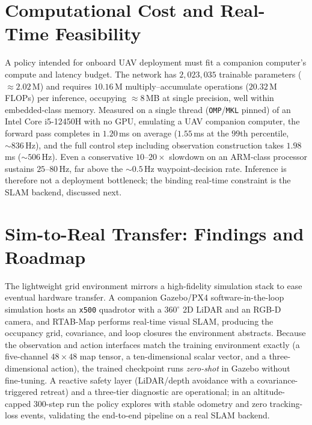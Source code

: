 \documentclass[runningheads]{llncs}
\begin{document}
\section{Computational Cost and Real-Time Feasibility}
A policy intended for onboard UAV deployment must fit a companion computer's compute and latency budget. The network has $2{,}023{,}035$ trainable parameters ($\approx\!2.02$\,M) and requires $10.16$\,M multiply--accumulate operations ($20.32$\,M FLOPs) per inference, occupying $\approx\!8$\,MB at single precision, well within embedded-class memory. Measured on a single thread (\texttt{OMP}/\texttt{MKL} pinned) of an Intel Core i5-12450H with no GPU, emulating a UAV companion computer, the forward pass completes in $1.20$\,ms on average ($1.55$\,ms at the $99$th percentile, $\sim\!836$\,Hz), and the full control step including observation construction takes $1.98$\,ms ($\sim\!506$\,Hz). Even a conservative $10\text{--}20\times$ slowdown on an ARM-class processor sustains $25\text{--}80$\,Hz, far above the $\sim\!0.5$\,Hz waypoint-decision rate. Inference is therefore not a deployment bottleneck; the binding real-time constraint is the SLAM backend, discussed next.

\section{Sim-to-Real Transfer: Findings and Roadmap}\label{sec:sim2real}
The lightweight grid environment mirrors a high-fidelity simulation stack to ease eventual hardware transfer. A companion Gazebo/PX4 software-in-the-loop simulation hosts an \texttt{x500} quadrotor with a $360^\circ$ 2D LiDAR and an RGB-D camera, and RTAB-Map performs real-time visual SLAM, producing the occupancy grid, covariance, and loop closures the environment abstracts. Because the observation and action interfaces match the training environment exactly (a five-channel $48\!\times\!48$ map tensor, a ten-dimensional scalar vector, and a three-dimensional action), the trained checkpoint runs \emph{zero-shot} in Gazebo without fine-tuning. A reactive safety layer (LiDAR/depth avoidance with a covariance-triggered retreat) and a three-tier diagnostic are operational; in an altitude-capped 300-step run the policy explores with stable odometry and zero tracking-loss events, validating the end-to-end pipeline on a real SLAM backend.
\end{document}
